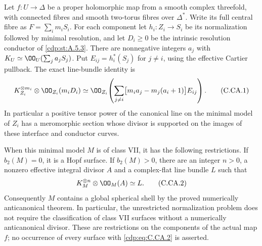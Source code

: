 
\begin{proposition}\label{cdp:st:C.2.UN.17}
Let $f:U\to\Delta$ be a proper holomorphic map from a smooth
complex threefold, with connected fibres and smooth two-torus
fibres over $\Delta^*$. Write its full central fibre as
$F=\sum_i m_iS_i$. For each component let
$h_i:Z_i\to S_i$ be its normalization followed by minimal
resolution, and let $D_i\ge0$ be the intrinsic resolution
conductor of \ref{cdp:st:A.5.3}. There are nonnegative integers $a_j$ with
$K_U\simeq\OO_U(\sum_j a_jS_j)$. Put
$E_{ij}=h_i^*(S_j)$ for $j\ne i$, using the effective
Cartier pullback. The exact line-bundle identity is
\[
 K_{Z_i}^{\otimes m_i}\otimes\OO_{Z_i}(m_iD_i)
 \simeq
 \OO_{Z_i}\!\left(
  \sum_{j\ne i}\bigl[m_i a_j-m_j(a_i+1)\bigr]E_{ij}
 \right).                                                \tag{C.CA.1}\label{cdp:eq:C.CA.1}
\]
In particular a positive tensor power of the canonical line on the minimal
model of $Z_i$ has a meromorphic section whose divisor is
supported on the images of these interface and conductor
curves.

When this minimal model $M$ is of class VII, it has the
following restrictions. If $b_2(M)=0$, it is a Hopf surface.
If $b_2(M)>0$, there are an integer $n>0$, a nonzero
effective integral divisor $A$ and a complex-flat line
bundle $L$ such that
\[
                 K_M^{\otimes n}\otimes\OO_M(A)
                         \simeq L.                       \tag{C.CA.2}\label{cdp:eq:C.CA.2}
\]
Consequently $M$ contains a global spherical shell by the
proved numerically anticanonical theorem. In particular,
the unrestricted normalization problem does not require
the classification of class VII surfaces without a
numerically anticanonical divisor. These are restrictions
on the components of the actual map $f$; no occurrence of
every surface with \eqref{cdp:eq:C.CA.2} is asserted.
\end{proposition}
